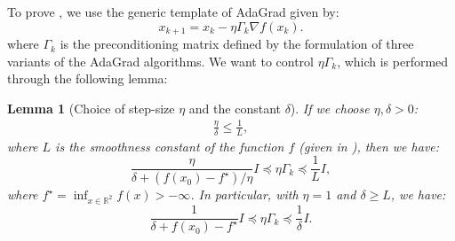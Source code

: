 \documentclass{article}
\theoremstyle{plain}
\newtheorem{lemma}[theorem]{Lemma}
\theoremstyle{definition}
\theoremstyle{remark}
\newcommand*{\RR}{\mathbb{R}}
\begin{document}
To prove , we use the generic template of AdaGrad given by:
\begin{equation}
    \label{eq:abstract-adagrad}
    x_{k + 1} = x_{k} - \eta \Gamma_k \nabla f(x_k).
\end{equation}
where $\Gamma_k$ is the preconditioning matrix defined by the formulation of three variants of the AdaGrad algorithms.
We want to control $\eta \Gamma_k$, which is performed through the following lemma: 
\begin{lemma}[Choice of step-size $\eta$ and the constant $\delta$]
    \label{lemma:step-size-choice}
    If we choose $\eta, \delta > 0$:
    \begin{equation*}
        \begin{aligned}
            \frac{\eta}{\delta} \leq \frac{1}{L},    
        \end{aligned} 
    \end{equation*}
    where $L$ is the smoothness constant of the function $f$ (given in ), then we have:
    \begin{equation*}
        \frac{\eta}{\delta + (f(x_0) - f^\star) / \eta} I\preceq \eta \Gamma_k \preceq \frac{1}{L}I,
    \end{equation*}
    where $f^\star = \inf_{x \in \RR^2} f(x) > -\infty$. In particular, with $\eta = 1$ and $\delta \geq L$, we have:
    \begin{equation*}
        \frac{1}{\delta + f(x_0) - f^\star} I \preceq \eta \Gamma_k \preceq \frac{1}{\delta} I.
    \end{equation*}
\end{lemma}
\end{document}
